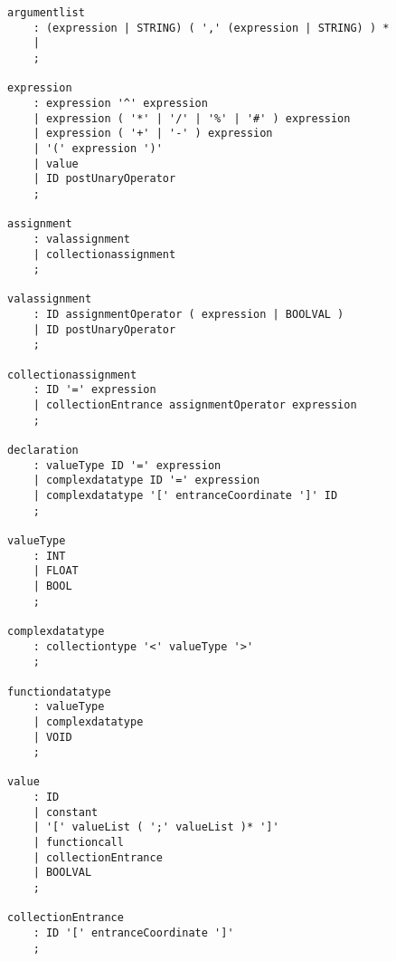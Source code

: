 \begin{lstlisting}[caption={\acrshort{cfg} and Lexing rules},frame=tlrb,numbers=none]
argumentlist
    : (expression | STRING) ( ',' (expression | STRING) ) *
    | 
    ;

expression                                            
    : expression '^' expression                       
    | expression ( '*' | '/' | '%' | '#' ) expression 
    | expression ( '+' | '-' ) expression             
    | '(' expression ')'                              
    | value                                           
    | ID postUnaryOperator                            
    ;                                                 
                                                      
assignment
    : valassignment
	| collectionassignment
    ;

valassignment                                       
	: ID assignmentOperator ( expression | BOOLVAL )
    | ID postUnaryOperator                          
	;                                               
                                                       
collectionassignment                                   
	: ID '=' expression                                
	| collectionEntrance assignmentOperator expression 
	;                                                  
	
declaration                                           
    : valueType ID '=' expression                     
    | complexdatatype ID '=' expression               
    | complexdatatype '[' entranceCoordinate ']' ID   
    ;                                                 
    
valueType                          
    : INT                          
    | FLOAT                        
    | BOOL                         
    ;                              
                                   
complexdatatype
    : collectiontype '<' valueType '>'
    ;

functiondatatype
    : valueType
    | complexdatatype
    | VOID
    ;

value                                      
    : ID                                   
    | constant                             
    | '[' valueList ( ';' valueList )* ']' 
    | functioncall                         
    | collectionEntrance                   
    | BOOLVAL                              
    ;                                      
                                           
collectionEntrance
    : ID '[' entranceCoordinate ']'
    ;


\end{lstlisting}
